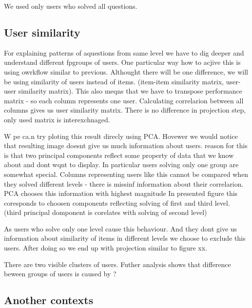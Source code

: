 \documentclass[
  digital, %
  table,   %
  nolof,     %
  nolot,     %
  nocover
]{fithesis3}
\begin{document}
We used only users who solved all questions.

\subsection{User similarity}\label{user-similarity}


For explaining patterns of aquestions from same level we have to dig
deeper and understand different fpgroups of users. One particular way
how to acjive this is using owrkflow similar to previous. Althought
there will be one difference, we will be using similarity of users
instead of items. (item-item similarity matrix, user-user similarity
matrix). This also meqns that we have to transpose performance matrix -
so each column represents one user. Calculating correlarion between all
columns gives us user similarity matrix. There is no difference in
projection step, only used matrix is interexchnaged.

W pe ca.n try ploting this result direcly using PCA. Hovewer we would
notice that resulting image doesnt give us much information about users.
reason for this is that two principal components reflect some property
of data that we know about and dont wqnt to display. In particular users
solving only one group are somewhat special. Columns representing users
like this cannot be compared when they solved different levels - there
is missinf information about their correlarion. PCA chooses this
information with highest magnitude In presented figure this coresponds
to choosen components reflecting solving of first and third level.
(third principal domponent is corelates with solving of second level)

As users who solve only one level cause this behaviour. And they dont
give us information about similarity of items in different levels we
choose to exclude this users. After doing so we end up with projection
similar to figure xx.

There are two visible clusters of users. Futher analysis shows that
difference beween groups of users is caused by ?

\subsection{Another contexts}\label{another-contexts}


\end{document}

